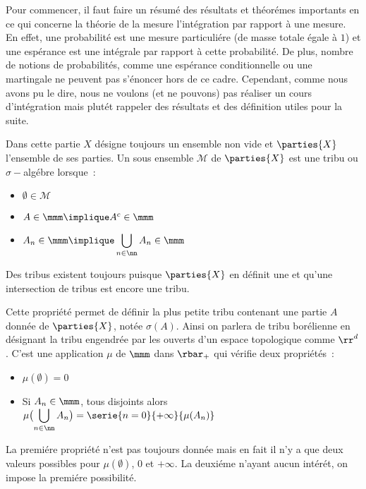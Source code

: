 Pour commencer, il faut faire un résumé des résultats et théorémes importants en ce qui concerne la théorie de
la mesure l'intégration par rapport à une mesure. En effet, une probabilité est une mesure particuliére (de masse totale
égale à $1$) et une espérance est une intégrale par rapport à cette probabilité. De plus, nombre de notions de probabilités,
comme une espérance conditionnelle ou une martingale ne peuvent pas s'énoncer hors de ce cadre. Cependant, comme nous avons pu
le dire, nous ne voulons (et ne pouvons) pas réaliser un cours d'intégration mais plutét rappeler des résultats et des définition 
utiles pour la suite.\par
Dans cette partie $X$ désigne toujours un ensemble non vide et $\parties{X}$ l'ensemble de ses parties.
 Un sous ensemble $\mathcal{M}$ de $\parties{X}$ est une tribu ou $\sigma-$algébre
lorsque~:\par
\begin{itemize}
\item{} $\emptyset \in \mathcal{M}$
\item{} $A\in \mmm \implique A^c\in \mmm$
\item{} $\displaystyle{A_n \in \mmm \implique \bigcup_{n\in \nn}A_n\in \mmm}$
\end{itemize}
Des tribus existent toujours puisque $\parties{X}$ en définit une et qu'une intersection de tribus est encore une
tribu.\par
\rmq Cette propriété permet de définir la plus petite tribu contenant une partie $A$ donnée de $\parties{X}$, notée
$\sigma (A)$. Ainsi on parlera de tribu borélienne en désignant la tribu engendrée par les ouverts d'un espace
topologique comme ${\rr}^d$.
 C'est une application $\mu$ de $\mmm$ dans $\rbar_+$ qui vérifie deux propriétés~:\par
\begin{itemize}
\item{} $\mu(\emptyset) = 0$
\item{} Si $A_n\in \mmm$, tous disjoints alors $\displaystyle{\mu \bigl(\bigcup_{n\in \nn}A_n\bigr) = 
                                                    \serie{n=0}{+\infty}{\mu(A_n)}}$
\end{itemize}
La premiére propriété n'est pas toujours donnée mais en fait il n'y a que deux valeurs possibles pour $\mu(\emptyset)$, 
$0$ et $+\infty$. La deuxiéme n'ayant aucun intérét, on impose la premiére possibilité.\par
